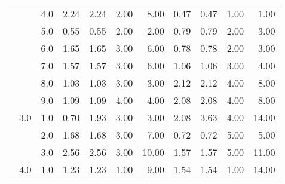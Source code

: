 \begin{tabular}{lllrrrrrrrr}
          &     & 4.0  &       2.24 &      2.24 &  2.00 &   8.00 &       0.47 &      0.47 &  1.00 &   1.00 \\
          &     & 5.0  &       0.55 &      0.55 &  2.00 &   2.00 &       0.79 &      0.79 &  2.00 &   3.00 \\
          &     & 6.0  &       1.65 &      1.65 &  3.00 &   6.00 &       0.78 &      0.78 &  2.00 &   3.00 \\
          &     & 7.0  &       1.57 &      1.57 &  3.00 &   6.00 &       1.06 &      1.06 &  3.00 &   4.00 \\
          &     & 8.0  &       1.03 &      1.03 &  3.00 &   3.00 &       2.12 &      2.12 &  4.00 &   8.00 \\
          &     & 9.0  &       1.09 &      1.09 &  4.00 &   4.00 &       2.08 &      2.08 &  4.00 &   8.00 \\
          & 3.0 & 1.0  &       0.70 &      1.93 &  3.00 &   3.00 &       2.08 &      3.63 &  4.00 &  14.00 \\
          &     & 2.0  &       1.68 &      1.68 &  3.00 &   7.00 &       0.72 &      0.72 &  5.00 &   5.00 \\
          &     & 3.0  &       2.56 &      2.56 &  3.00 &  10.00 &       1.57 &      1.57 &  5.00 &  11.00 \\
          & 4.0 & 1.0  &       1.23 &      1.23 &  1.00 &   9.00 &       1.54 &      1.54 &  1.00 &  14.00 \\
\bottomrule
\end{tabular}
